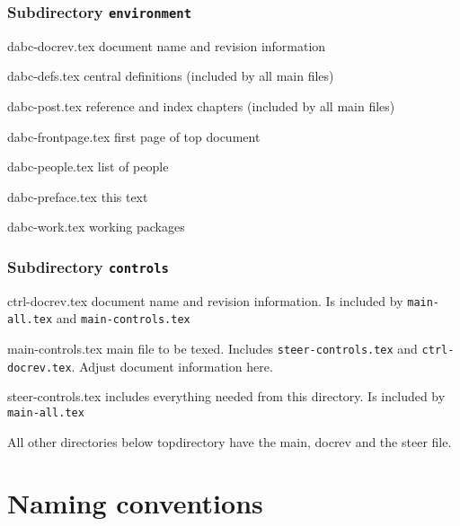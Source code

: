 \subsubsection{Subdirectory {\tt environment}}
\begin{compactdesc}
\item[dabc-docrev.tex] document name and revision information
\item[dabc-defs.tex] central definitions (included by all main files)
\item[dabc-post.tex] reference and index chapters (included by all main files)
\item[dabc-frontpage.tex] first page of top document
\item[dabc-people.tex] list of people
\item[dabc-preface.tex] this text
\item[dabc-work.tex] working packages
\end{compactdesc}
\subsubsection{Subdirectory {\tt controls}}
\begin{compactdesc}
\item[ctrl-docrev.tex] document name and revision information.
Is included by {\tt main-all.tex} and {\tt main-controls.tex}
\item[main-controls.tex] main file to be texed.
Includes {\tt steer-controls.tex} and {\tt ctrl-docrev.tex}. Adjust document information here.
\item[steer-controls.tex] includes everything needed from this directory.
Is included by {\tt main-all.tex}
\end{compactdesc}
All other directories below topdirectory have the main, docrev and the steer file.
\section{Naming conventions}
